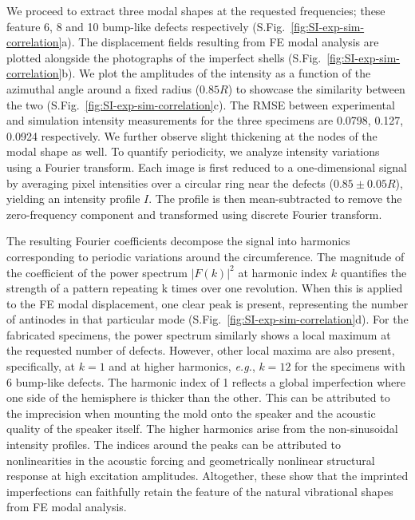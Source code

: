 \documentclass[letter,11pt]{article}
\begin{document}
We proceed to extract three modal shapes at the requested frequencies; these feature 6, 8 and 10 bump-like defects respectively (S.Fig.~\ref{fig:SI-exp-sim-correlation}a). The displacement fields resulting from FE modal analysis are plotted alongside the photographs of the imperfect shells (S.Fig.~\ref{fig:SI-exp-sim-correlation}b). We plot the amplitudes of the intensity as a function of the azimuthal angle  around a fixed radius ($0.85R$) to showcase the similarity between the two (S.Fig.~\ref{fig:SI-exp-sim-correlation}c). The RMSE between experimental and simulation intensity measurements for the three specimens are 0.0798, 0.127, 0.0924 respectively. We further observe slight thickening at the nodes of the modal shape as well. To quantify periodicity, we analyze intensity variations using a Fourier transform. Each image is first reduced to a one-dimensional signal by averaging pixel intensities over a circular ring near the defects ($0.85\pm0.05R$), yielding an intensity profile $I$. The profile is then mean-subtracted to remove the zero-frequency component and transformed using discrete Fourier transform. 

The resulting Fourier coefficients decompose the signal into harmonics corresponding to periodic variations around the circumference. The magnitude of the coefficient of the power spectrum $|F(k)|^2$ at harmonic index $k$ quantifies the strength of a pattern repeating k times over one revolution. When this is applied to the FE modal displacement, one clear peak is present, representing the number of antinodes in that particular mode (S.Fig.~\ref{fig:SI-exp-sim-correlation}d). For the fabricated specimens, the power spectrum similarly shows a local maximum at the requested number of defects. However, other local maxima are also present, specifically, at $k=1$ and at higher harmonics, \textit{e.g.}, $k=12$ for the specimens with 6 bump-like defects. The harmonic index of 1 reflects a global imperfection where one side of the hemisphere is thicker than the other. This can be attributed to the imprecision when mounting the mold onto the speaker and the acoustic quality of the speaker itself. The higher harmonics arise from the non-sinusoidal intensity profiles. The indices around the peaks can be attributed to nonlinearities in the acoustic forcing and geometrically nonlinear structural response at high excitation amplitudes. Altogether, these show that the imprinted imperfections can faithfully retain the feature of the natural vibrational shapes from FE modal analysis.
\end{document}
